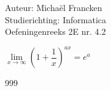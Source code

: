 \documentclass[a4paper]{article}
\begin{document}
\noindent \large Auteur: Michaël Francken \\
\noindent \large Studierichting: Informatica\\
\noindent \large Oefeningenreeks 2E nr. 4.2\\

\medskip

\normalsize

$\lim\limits_{x\rightarrow\infty} \left(1+\dfrac{1}{x}\right)^{ax}=e^a$\\



\begin{thebibliography}{999}
\end{thebibliography}
\end{document}
